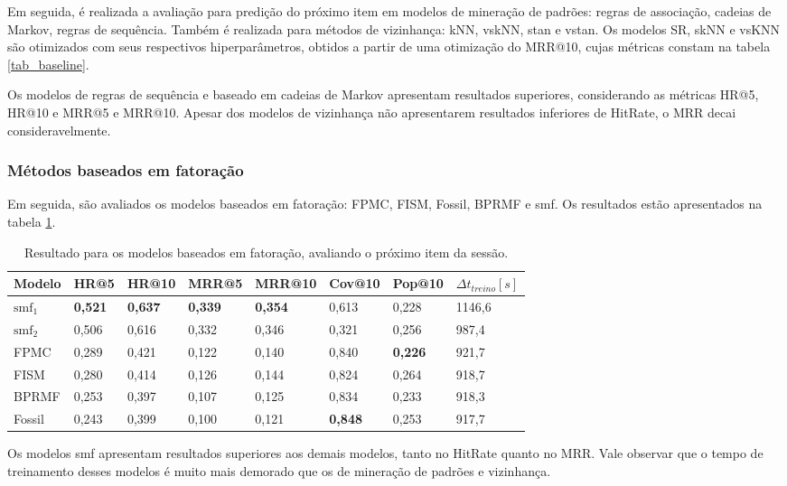 Em seguida, é realizada a avaliação para predição do próximo item em modelos de
mineração de padrões: regras de associação, cadeias de Markov, regras de
sequência. Também é realizada para métodos de vizinhança: kNN, vskNN, stan e
vstan. Os modelos SR, skNN e vsKNN são otimizados com seus respectivos
hiperparâmetros, obtidos a partir de uma otimização do MRR@10, cujas
métricas constam na tabela \ref{tab_baseline}.

Os modelos de regras de sequência e baseado em cadeias de Markov apresentam
resultados superiores, considerando as métricas HR@5, HR@10 e MRR@5 e MRR@10.
Apesar dos modelos de vizinhança não apresentarem resultados inferiores de HitRate,
o MRR decai consideravelmente.

\subsubsection{Métodos baseados em fatoração}
Em seguida, são avaliados os modelos baseados em fatoração: FPMC, FISM, Fossil,
BPRMF e smf. Os resultados estão apresentados na tabela \ref{tab_fatoracao}.

\begin{table}[htbp]
  \centering
  \begin{tabular}{|l|l|l|l|l|l|l|l|}
    \hline
    Modelo & HR@5 & HR@10 & MRR@5 & MRR@10 & Cov@10 & Pop@10 & $\Delta t_{treino} [s]$ \\
    \hline
    $\text{smf}_1$ & \textbf{0,521} & \textbf{0,637} & \textbf{0,339} & \textbf{0,354} & 0,613 & 0,228 & 1146,6 \\
    \hline
    $\text{smf}_2$ & 0,506 & 0,616 & 0,332 & 0,346 & 0,321 & 0,256 & 987,4 \\
    \hline
    FPMC & 0,289 & 0,421 & 0,122 & 0,140 & 0,840 & \textbf{0,226} & 921,7 \\
    \hline
    FISM & 0,280 & 0,414 & 0,126 & 0,144 & 0,824 & 0,264 & 918,7 \\
    \hline
    BPRMF & 0,253 & 0,397 & 0,107 & 0,125 & 0,834 & 0,233 & 918,3 \\
    \hline
    Fossil & 0,243 & 0,399 & 0,100 & 0,121 & \textbf{0,848} & 0,253 & 917,7 \\
    \hline
        \end{tabular}
  \caption{Resultado para os modelos baseados em fatoração, avaliando o próximo item da sessão.}
  \label{tab_fatoracao}
\end{table}

Os modelos smf apresentam resultados superiores aos demais modelos, tanto no
HitRate quanto no MRR. Vale observar que o tempo de treinamento desses modelos é
muito mais demorado que os de mineração de padrões e vizinhança.

